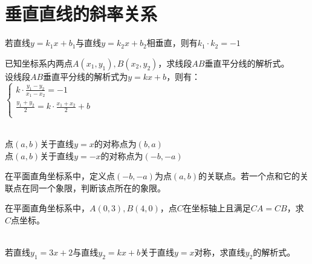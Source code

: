 \documentclass{ecnuthesis}
\begin{document}
\section{垂直直线的斜率关系}
\begin{conclusion}
    若直线$y=k_1x+b_1$与直线$y=k_2x+b_2$相垂直，则有$k_1·k_2=-1$
\end{conclusion}
\begin{example}
    已知坐标系内两点$A(x_1,y_1),B(x_2,y_2)$，求线段$AB$垂直平分线的解析式。\\
    设线段$AB$垂直平分线的解析式为$y=kx+b$，则有： \\
    $\begin{cases}k·\frac{y_1-y_2}{x_1-x_2}=-1 \\ \frac{y_1+y_2}{2}=k·\frac{x_1+x_2}{2}+b \\ \end{cases}$
\end{example}
\begin{corollary}
    \quad \\
    点$(a,b)$关于直线$y=x$的对称点为$(b,a)$ \\
    点$(a,b)$关于直线$y=-x$的对称点为$(-b,-a)$
\end{corollary}
\begin{problem}
    在平面直角坐标系中，定义点$(-b,-a)$为点$(a,b)$的关联点。若一个点和它的关联点在同一个象限，判断该点所在的象限。
\end{problem}
\begin{problem}
    在平面直角坐标系中，$A(0,3),B(4,0)$，点$C$在坐标轴上且满足$CA=CB$，求$C$点坐标。 \\
    \\
\end{problem}
\begin{problem}
    若直线$y_1=3x+2$与直线$y_2=kx+b$关于直线$y=x$对称，求直线$y_2$的解析式。 \\
    \\
\end{problem}

\clearpage
\end{document}
